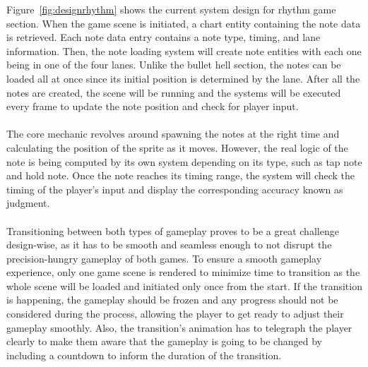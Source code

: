 \vspace{0.5cm}

\noindent Figure~\ref{fig:designrhythm} shows the current system design for rhythm game section.
When the game scene is initiated, a chart entity containing the note data is retrieved.
Each note data entry contains a note type, timing, and lane information.
Then, the note loading system will create note entities with each one being in one of the four lanes.
Unlike the bullet hell section, the notes can be loaded all at once since its initial position is determined by the lane.
After all the notes are created, the scene will be running and the systems will be executed every frame to update the note position and check for player input.
\\\\
The core mechanic revolves around spawning the notes at the right time and calculating the position of the sprite as it moves.
However, the real logic of the note is being computed by its own system depending on its type, such as tap note and hold note.
Once the note reaches its timing range, the system will check the timing of the player's input and
display the corresponding accuracy known as judgment.
\\\\
Transitioning between both types of gameplay proves to be a great challenge design-wise, as it has to be
smooth and seamless enough to not disrupt the precision-hungry gameplay of both games.
To ensure a smooth gameplay experience, only one game scene is rendered to minimize time to transition
as the whole scene will be loaded and initiated only once from the start.
If the transition is happening, the gameplay should be frozen and any progress should not be considered during the process,
allowing the player to get ready to adjust their gameplay smoothly.
Also, the transition's animation has to telegraph the player clearly to make them aware that the gameplay is going to be changed
by including a countdown to inform the duration of the transition.
